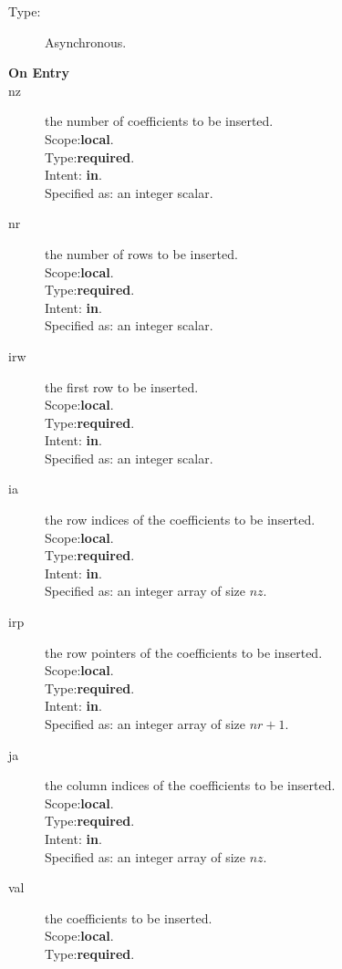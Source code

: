 \begin{description}
\item[Type:] Asynchronous.
\item[\bf On Entry]
\item[nz] the number of coefficients to be inserted.\\
Scope:{\bf local}.\\
Type:{\bf required}.\\
Intent: {\bf in}.\\
Specified as: an integer scalar.
\item[nr] the number of rows to be inserted.\\
Scope:{\bf local}.\\
Type:{\bf required}.\\
Intent: {\bf in}.\\
Specified as: an integer scalar.
\item[irw] the first  row to be inserted.\\
Scope:{\bf local}.\\
Type:{\bf required}.\\
Intent: {\bf in}.\\
Specified as: an integer scalar.
\item[ia] the row indices of the coefficients to be inserted.\\
Scope:{\bf local}.\\
Type:{\bf required}.\\
Intent: {\bf in}.\\
Specified as: an integer array of size $nz$.
\item[irp] the row pointers of the coefficients to be inserted.\\
Scope:{\bf local}.\\
Type:{\bf required}.\\
Intent: {\bf in}.\\
Specified as: an integer array of size $nr+1$.
\item[ja] the column indices of the coefficients to be inserted.\\
Scope:{\bf local}.\\
Type:{\bf required}.\\
Intent: {\bf in}.\\
Specified as: an integer array of size $nz$.
\item[val] the coefficients to be inserted.\\
Scope:{\bf local}.\\
Type:{\bf required}.\\

\end{description}
